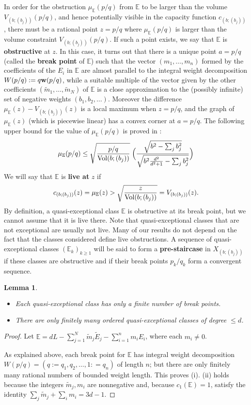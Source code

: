 \documentclass[11pt, reqno]{amsart}
\newtheorem{lemma}[thm]{Lemma}
\theoremstyle{remark}
\numberwithin{equation}{subsection}
\numberwithin{figure}{section}
\theoremstyle{customremark}
\newcommand{\Vol}{{\rm Vol}}
\newcommand{\bw}{{\bf w}}
\newcommand{\TE}{{\widetilde E}}
\newcommand{\Tm}{{\widetilde m}}
\newcommand{\bE}{{\mathbb E}}
\begin{document}
In order for the obstruction $ \mu_{\bE}(p/q)$  from  $\bE$ to be larger than the volume $V_{(b;(b_j))}(p/q)$, and hence potentially visible in the capacity function $c_{(b;(b_j))}$, 
there must be a rational point $z=p/q$ where $\mu_{\bE}(p/q)$ is  
 larger than the volume constraint $V_{(b;(b_j))}(p/q)$.   If such a point exists, we say that $\bE$ is {\bf obstructive} at $z$.  In this case,
it turns out that there is a unique point $a=p/q$ (called the {\bf break point} of $\bE$) such that
the vector  $(m_1,\dots,m_n)$ formed by the coefficients of the $E_i$ in
$\bE$  are almost parallel to the integral weight decomposition
 $W(p/q): = q \bw(p/q)$, while a suitable multiple of the vector given by the other  coefficients
$(\Tm_1, \dots,\Tm_N)$ of $\bE$  is a close approximation to the (possibly infinite) set of negative weights $(b_1,b_2,\dots)$.
Moreover the difference $ \mu_{\bE}(z) - V_{(b;(b_j))}(z)$ is a local maximum when $z=p/q$, and the graph of $ \mu_{\bE}(z)$ (which is piecewise linear)
 has a convex corner at $a=p/q$.  The following upper bound for the value of $ \mu_{\bE}(p/q) $  is proved in \cite[Lem.2.28]{AADT}:
\begin{align}\label{eq:light} 
 \mu_{\bE}(p/q)  \le \sqrt\frac{p/q}{\Vol(b;(b_j))}\; \Bigl(\frac{\sqrt{b^2-\sum_j b_j^2}}{
 \sqrt{b^2\frac{d^2}{d^2+1}-\sum_j  b_j^2}}\Bigr)
\end{align}
We will say that $\bE$ is {\bf live at} $z$   if $$
c_{(b;(b_j))}(z) = \mu_\bE(z)>  \sqrt\frac{z}{\Vol(b;(b_j))} = V_{(b;(b_j))}(z).
$$  By definition, a quasi-exceptional  class $\bE$ is obstructive at its break point, but we cannot assume that it is  live there.  Note that quasi-exceptional classes that are not exceptional are usually not live.
Many of our results do not depend on the fact that the classes considered define live obstructions.  A sequence of quasi-exceptional classes $(\bE_k)_{k\ge 1}$ will be said to form a {\bf pre-staircase} in $X_{(b;(b_j))}$ if these classes are obstructive and if their break points $p_k/q_k$ form a convergent sequence.


\begin{lemma}\label{lem:basicE} \begin{itemize}\item[{\rm(i)}]
Each quasi-exceptional class has only a finite number of break points.
\item[{\rm(ii)}]  There are only finitely many ordered  quasi-exceptional classes of 
degree  $\le d$.
\end{itemize}
\end{lemma}
\begin{proof}  Let $\bE = dL - \sum_{j=1}^N \Tm_j \TE_j - \sum_{i=1}^n m_i E_i$, where each $m_i\ne 0$.

As explained above, each break point for $\bE$ has integral  weight decomposition  $W(p/q) = (q:=q_1,q_2,\dots,1: = q_n)$ of length $n$; but there are only  finitely many rational numbers of bounded weight length.  This proves (i).   (ii) holds because the integers $\Tm_j, m_i$ are nonnegative and, because $c_1(\bE) = 1$, satisfy the identity $\sum_j \Tm_j +\sum_i m_i = 3d-1$.
\end{proof}
\end{document}
